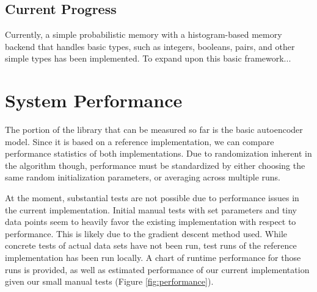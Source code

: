 \documentclass{sig-alternate}
\begin{document}
\subsection{Current Progress}
\label{sec:current prog}

Currently, a simple probabilistic memory with a histogram-based memory backend that handles basic 
types, such as integers, booleans, pairs, and other simple types has been implemented. To expand 
upon this basic framework...

\section{System Performance}
\label{sec:sysperformance}

The portion of the library that can be measured so far is the basic autoencoder model. 
Since it is based on a reference implementation, we can compare performance statistics of both
implementations. Due to randomization inherent in the algorithm though, performance must be
standardized by either choosing the same random initialization parameters, or averaging 
across multiple runs. 

At the moment, substantial tests are not possible due to performance issues in the current 
implementation. Initial
manual tests with set parameters and tiny data points seem to heavily favor the existing 
implementation with respect to performance. This is likely due to the gradient descent
method used. While concrete 
tests of actual data sets have not 
been run, test runs of the reference implementation has been run locally. A chart of runtime
performance for those runs is provided, as well as estimated performance of our current 
implementation given our small manual tests (Figure \ref{fig:performance}). 
\end{document}
